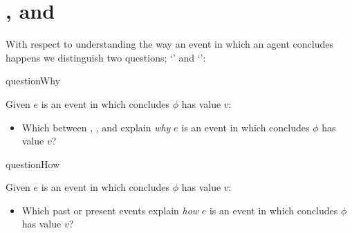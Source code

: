 \section*{\qWhy{}, \qHow{} and \issueInclusion{}}
\label{cha:intro:why-how}

\begin{note}
  With respect to understanding the way an event in which an agent concludes happens we distinguish two questions; `\qWhy{}' and `\qHow{}':

  \begin{question}{questionWhy}{\qWhy{}}
    \medskip

    Given \(e\) is an event in which \vAgent{} concludes \(\phi\) has value \(v\):
    \begin{itemize}
    \item
      Which \ros{} between , , and  explain \emph{why} \(e\) is an event in which \vAgent{} concludes \(\phi\) has value \(v\)?
    \end{itemize}
    \vspace{-1.5\baselineskip}
  \end{question}

  \begin{question}{questionHow}{\qHow{}}
    \label{q:how}
    \medskip

    Given \(e\) is an event in which \vAgent{} concludes \(\phi\) has value \(v\):
    \begin{itemize}
    \item
      Which past or present events explain \emph{how} \(e\) is an event in which \vAgent{} concludes \(\phi\) has value \(v\)?
    \end{itemize}
    \vspace{-1.5\baselineskip}
  \end{question}
\end{note}

